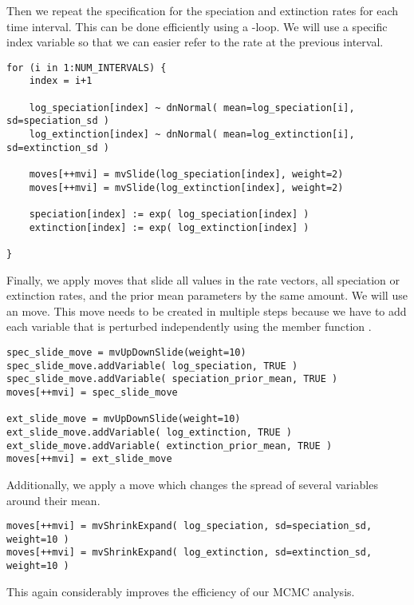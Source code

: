 Then we repeat the specification for the speciation and extinction rates for each time interval.
This can be done efficiently using a -loop.
We will use a specific index variable so that we can easier refer to the rate at the previous interval.
{\tt \begin{snugshade*}
\begin{lstlisting}
for (i in 1:NUM_INTERVALS) {
    index = i+1
    
    log_speciation[index] ~ dnNormal( mean=log_speciation[i], sd=speciation_sd )
    log_extinction[index] ~ dnNormal( mean=log_extinction[i], sd=extinction_sd )

    moves[++mvi] = mvSlide(log_speciation[index], weight=2)
    moves[++mvi] = mvSlide(log_extinction[index], weight=2)

    speciation[index] := exp( log_speciation[index] )
    extinction[index] := exp( log_extinction[index] )

}
\end{lstlisting}
\end{snugshade*}}
Finally, we apply moves that slide all values in the rate vectors, \IE all speciation or extinction rates, and the prior mean parameters by the same amount. 
We will use an  move.
This move needs to be created in multiple steps because we have to add each variable that is perturbed independently using the member function .
{\tt \begin{snugshade*}
\begin{lstlisting}
spec_slide_move = mvUpDownSlide(weight=10)
spec_slide_move.addVariable( log_speciation, TRUE )
spec_slide_move.addVariable( speciation_prior_mean, TRUE )
moves[++mvi] = spec_slide_move

ext_slide_move = mvUpDownSlide(weight=10)
ext_slide_move.addVariable( log_extinction, TRUE )
ext_slide_move.addVariable( extinction_prior_mean, TRUE )
moves[++mvi] = ext_slide_move
\end{lstlisting}
\end{snugshade*}}

Additionally, we apply a  move which changes the spread of several variables around their mean.
{\tt \begin{snugshade*}
\begin{lstlisting}
moves[++mvi] = mvShrinkExpand( log_speciation, sd=speciation_sd, weight=10 )
moves[++mvi] = mvShrinkExpand( log_extinction, sd=extinction_sd, weight=10 )
\end{lstlisting}
\end{snugshade*}}
This again considerably improves the efficiency of our MCMC analysis.


